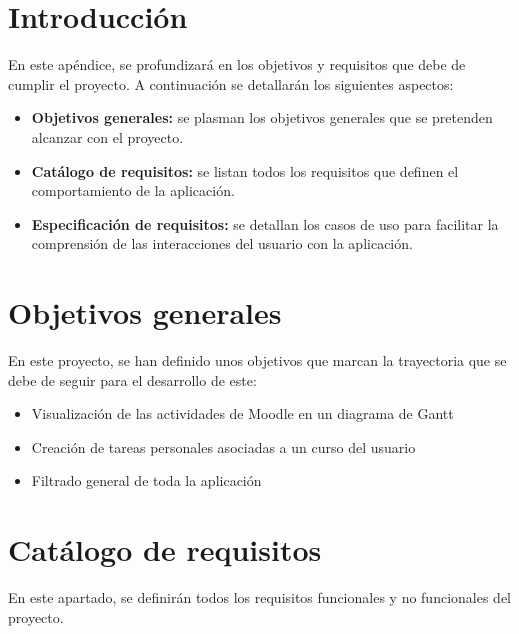 
\section{Introducción}
En este apéndice, se profundizará en los objetivos y requisitos que debe de cumplir el proyecto. A continuación se detallarán los siguientes aspectos:
\begin{itemize}
    \item \textbf{Objetivos generales:} se plasman los objetivos generales que se pretenden alcanzar con el proyecto.
    \item \textbf{Catálogo de requisitos:} se listan todos los requisitos que definen el comportamiento de la aplicación.
    \item \textbf{Especificación de requisitos:} se detallan los casos de uso para facilitar la comprensión de las interacciones del usuario con la aplicación.
\end{itemize}

\section{Objetivos generales}
En este proyecto, se han definido unos objetivos que marcan la trayectoria que se debe de seguir para el desarrollo de este:
\begin{itemize}
    \item Visualización de las actividades de Moodle en un diagrama de Gantt
    \item Creación de tareas personales asociadas a un curso del usuario
    \item Filtrado general de toda la aplicación
\end{itemize}

\section{Catálogo de requisitos}
En este apartado, se definirán todos los requisitos funcionales y no funcionales del proyecto.

